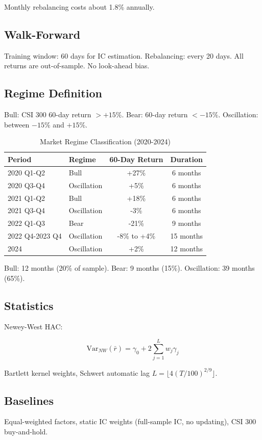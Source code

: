 Monthly rebalancing costs about 1.8\% annually.

\subsection{Walk-Forward}

Training window: 60 days for IC estimation. Rebalancing: every 20 days. All returns are out-of-sample. No look-ahead bias.

\subsection{Regime Definition}

Bull: CSI 300 60-day return $> +15\%$. Bear: 60-day return $< -15\%$. Oscillation: between $-15\%$ and $+15\%$.

\begin{table}[h]
\centering
\caption{Market Regime Classification (2020-2024)}
\label{tab:regime_periods}
\begin{tabular}{llcc}
\toprule
Period & Regime & 60-Day Return & Duration \\
\midrule
2020 Q1-Q2 & Bull & +27\% & 6 months \\
2020 Q3-Q4 & Oscillation & +5\% & 6 months \\
2021 Q1-Q2 & Bull & +18\% & 6 months \\
2021 Q3-Q4 & Oscillation & -3\% & 6 months \\
2022 Q1-Q3 & Bear & -21\% & 9 months \\
2022 Q4-2023 Q4 & Oscillation & -8\% to +4\% & 15 months \\
2024 & Oscillation & +2\% & 12 months \\
\bottomrule
\end{tabular}
\end{table}

Bull: 12 months (20\% of sample). Bear: 9 months (15\%). Oscillation: 39 months (65\%).

\subsection{Statistics}

Newey-West HAC:

\begin{equation}
\text{Var}_{NW}(\bar{r}) = \gamma_0 + 2 \sum_{j=1}^{L} w_j \gamma_j
\end{equation}

Bartlett kernel weights, Schwert automatic lag $L = \lfloor 4(T/100)^{2/9} \rfloor$.

\subsection{Baselines}

Equal-weighted factors, static IC weights (full-sample IC, no updating), CSI 300 buy-and-hold.